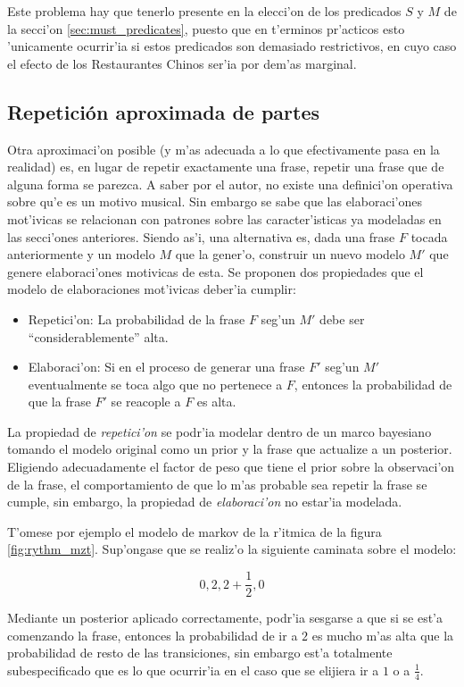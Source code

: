 Este problema hay que tenerlo presente en la elecci'on de los predicados $S$ y $M$ de la secci'on \ref{sec:must_predicates}, puesto que en t'erminos pr'acticos esto 'unicamente
ocurrir'ia si estos predicados son demasiado restrictivos, en cuyo caso el efecto de los Restaurantes Chinos ser'ia por dem'as marginal.


\subsection{Repetici\'on aproximada de partes}
Otra aproximaci'on posible (y m'as adecuada a lo que efectivamente pasa en la realidad) es, en lugar de repetir exactamente una frase, repetir una frase que de alguna forma se parezca. 
A saber por el autor, no existe una definici'on operativa sobre qu'e es un motivo musical. Sin embargo se sabe que las elaboraci'ones mot'ivicas se relacionan 
con patrones sobre las caracter'isticas ya modeladas en las secci'ones anteriores. Siendo as'i, una alternativa es, dada una frase $F$ tocada anteriormente y un modelo $M$ que la gener'o, 
construir un nuevo modelo $M'$ que genere elaboraci'ones motivicas de esta. Se proponen dos propiedades que el modelo de elaboraciones mot'ivicas deber'ia cumplir:

\begin{itemize}
 \item Repetici'on: La probabilidad de la frase $F$ seg'un $M'$ debe ser ``considerablemente'' alta. 
 \item Elaboraci'on: Si en el proceso de generar una frase $F'$ seg'un $M'$ eventualmente se toca algo que no pertenece a $F$, entonces la probabilidad de que la frase $F'$ se reacople a $F$ es alta.
\end{itemize}

La propiedad de \emph{repetici'on} se podr'ia modelar dentro de un marco bayesiano tomando el modelo original como un prior y la frase que actualize a un posterior. 
Eligiendo adecuadamente el factor de peso que tiene el prior sobre la observaci'on de la frase, el comportamiento de que lo m'as probable sea repetir la frase se cumple, 
sin embargo, la propiedad de \emph{elaboraci'on} no estar'ia modelada.

T'omese por ejemplo el modelo de markov de la r'itmica de la figura \ref{fig:rythm_mzt}. Sup'ongase que se realiz'o la siguiente caminata sobre el modelo:

$$0, 2, 2+\frac{1}{2}, 0$$

Mediante un posterior aplicado correctamente, podr'ia sesgarse a que si se est'a comenzando la frase, entonces la probabilidad de ir a $2$ es mucho m'as alta que la probabilidad de resto
de las transiciones, sin embargo est'a totalmente subespecificado que es lo que ocurrir'ia en el caso que se elijiera ir a $1$ o a $\frac{1}{4}$. 

